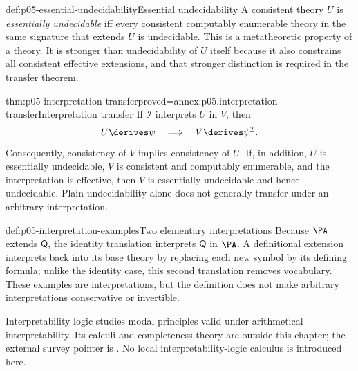 \begin{hbdefinition}{def:p05-essential-undecidability}{Essential undecidability}
A consistent theory \(U\) is \emph{essentially undecidable} iff every
consistent computably enumerable theory in the same signature that
extends \(U\) is undecidable.  This is a metatheoretic property of a
theory.  It is stronger than undecidability of \(U\) itself because it
also constrains all consistent effective extensions, and that stronger
distinction is required in the transfer theorem.
\end{hbdefinition}

\begin{hbtheorem}{thm:p05-interpretation-transfer}{proved=annex:p05.interpretation-transfer}{Interpretation transfer}
If \(\mathcal I\) interprets \(U\) in \(V\), then
\[
  U\derives\psi\quad\Longrightarrow\quad
  V\derives\psi^{\mathcal I}.
\]
Consequently, consistency of \(V\) implies consistency of \(U\).  If,
in addition, \(U\) is essentially undecidable, \(V\) is consistent and
computably enumerable, and the interpretation is effective, then \(V\)
is essentially undecidable and hence undecidable.  Plain undecidability
alone does not generally transfer under an arbitrary interpretation.
\end{hbtheorem}

\begin{hbexample}{def:p05-interpretation-examples}{Two elementary interpretations}
Because \(\PA\) extends \(\mathsf Q\), the identity translation interprets
\(\mathsf Q\) in \(\PA\).  A definitional extension interprets back into
its base theory by replacing each new symbol by its defining formula;
unlike the identity case, this second translation removes vocabulary.
These examples are interpretations, but the definition does not make
arbitrary interpretations conservative or invertible.
\end{hbexample}

Interpretability logic studies modal principles valid under arithmetical
interpretability.  Its calculi and completeness theory are outside this
chapter; the external survey pointer is \cite{Visser1997}.  No local
interpretability-logic calculus is introduced here.
